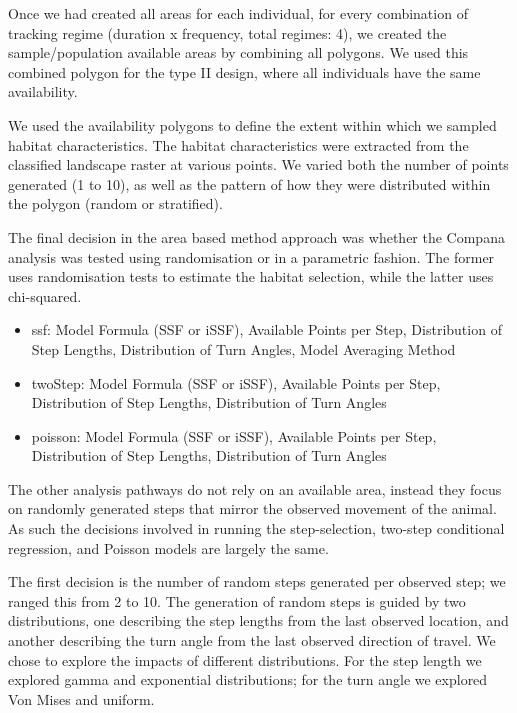 \documentclass[10pt,a4paper]{article}
\providecommand{\tightlist}{%
  \setlength{\itemsep}{0pt}\setlength{\parskip}{0pt}}
\begin{document}
Once we had created all areas for each individual, for every combination of tracking regime (duration x frequency, total regimes: 4), we created the sample/population available areas by combining all polygons.
We used this combined polygon for the type II design, where all individuals have the same availability.

We used the availability polygons to define the extent within which we sampled habitat characteristics.
The habitat characteristics were extracted from the classified landscape raster at various points.
We varied both the number of points generated (1 to 10), as well as the pattern of how they were distributed within the polygon (random or stratified).

The final decision in the area based method approach was whether the Compana analysis was tested using randomisation or in a parametric fashion.
The former uses randomisation tests to estimate the habitat selection, while the latter uses chi-squared.

\begin{itemize}
\tightlist
\item
  ssf: Model Formula (SSF or iSSF), Available Points per Step, Distribution of Step Lengths, Distribution of Turn Angles, Model Averaging Method
\item
  twoStep: Model Formula (SSF or iSSF), Available Points per Step, Distribution of Step Lengths, Distribution of Turn Angles
\item
  poisson: Model Formula (SSF or iSSF), Available Points per Step, Distribution of Step Lengths, Distribution of Turn Angles
\end{itemize}

The other analysis pathways do not rely on an available area, instead they focus on randomly generated steps that mirror the observed movement of the animal.
As such the decisions involved in running the step-selection, two-step conditional regression, and Poisson models are largely the same.

The first decision is the number of random steps generated per observed step; we ranged this from 2 to 10.
The generation of random steps is guided by two distributions, one describing the step lengths from the last observed location, and another describing the turn angle from the last observed direction of travel.
We chose to explore the impacts of different distributions.
For the step length we explored gamma and exponential distributions; for the turn angle we explored Von Mises and uniform.
\end{document}
